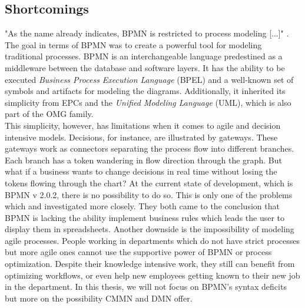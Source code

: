 \subsection{Shortcomings} 
"As the name already indicates, BPMN is restricted to process modeling [...]" \cite{Lankhorst2009}. The goal in terms of BPMN was to create a powerful tool for modeling traditional processes. BPMN is an interchangeable language predestined as a middleware between the database and software layers. It has the ability to be executed \textit{Business Process Execution Language} (BPEL) and a well-known set of symbols and artifacts for modeling the diagrams. Additionally, it inherited its simplicity from EPCs and the \textit{Unified Modeling Language} (UML), which is also part of the OMG family. \\
This simplicity, however, has limitations when it comes to agile and decision intensive models. Decisions, for instance, are illustrated by gateways. These gateways work as connectors separating the process flow into different branches. Each branch has a token wandering in flow direction through the graph. But what if a business wants to change decisions in real time without losing the tokens flowing through the chart? At the current state of development, which is BPMN v 2.0.2, there is no possibility to do so. This is only one of the problems which \cite{Repa2014} and \cite{ReckerIndulskaRosemannEtAl2006} investigated more closely. They both came to the conclusion that BPMN is lacking the ability implement business rules which leads the user to display them in spreadsheets. 
Another downside is the impossibility of modeling agile processes. People working in departments which do not have strict processes but more agile ones cannot use the supportive power of BPMN or process optimization. Despite their knowledge intensive work, they still can benefit from optimizing workflows, or even help new employees getting known to their new job in the department. In this thesis, we will not focus on \ac{BPMN}'s syntax deficits but more on the possibility CMMN and DMN offer. 

